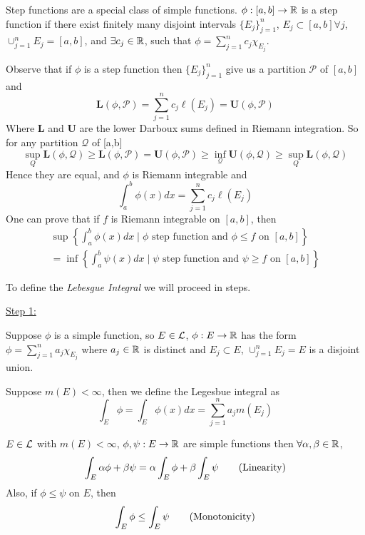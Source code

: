 \begin{definition}
    Step functions are a special class of simple functions. $\phi: [a,b] \rightarrow \mathbb{R}$ is a step function if there exist finitely many disjoint intervals $\{ E_j\}_{j=1}^{n}$, $E_j \subset [a,b] \forall j$, $\cup_{j=1}^{n} E_j = [a,b]$, and $\exists c_j \in \mathbb{R}$, such that $\phi = \sum_{j=1}^{n} c_j \chi_{E_j}$.
\end{definition}

Observe that if $\phi$ is a step function then $\{E_j\}_{j=1}^{n}$ give us a partition $\mathcal{P}$ of $[a,b]$ and
\[
    \mathbf{L} (\phi, \mathcal{P}) = \sum_{j=1}^{n} c_j \ell (E_j) = \mathbf{U}(\phi, \mathcal{P})
\]
Where $\mathbf{L}$ and $\mathbf{U}$ are the lower Darboux sums defined in Riemann integration.
So for any partition $\mathcal{Q}$ of [a,b]
\[
    \sup_{Q} \mathbf{L} (\phi, \mathcal{Q}) \geq \mathbf{L} (\phi, \mathcal{P}) =  \mathbf{U}(\phi, \mathcal{P}) \geq \inf_{\mathcal{Q}}\mathbf{U}(\phi, \mathcal{Q}) \geq \sup_{Q} \mathbf{L} (\phi, \mathcal{Q})
\]
Hence they are equal, and $\phi$ is Riemann integrable and
\[
    \int_{a}^{b} \phi(x) dx =  \sum_{j=1}^{n} c_j \ell (E_j)
\]
One can prove that if $f$ is Riemann integrable on $[a,b]$, then
\begin{gather*}
    \sup \left\{ \int_{a}^{b} \phi (x) dx \mid \phi \text{ step function and } \phi \leq f \text{ on } [a,b] \right\} \\
    = \inf \left\{ \int_{a}^{b} \psi (x) dx \mid \psi \text{ step function and } \psi \geq f \text{ on } [a,b] \right\}
\end{gather*}

To define the \emph{Lebesgue Integral} we will proceed in steps.

\underline{Step 1:}

Suppose $\phi$ is a simple function, so $E \in \mathcal{L}$, $\phi: E\rightarrow \mathbb{R}$ has the form $\phi = \sum_{j=1}^{n} a_j \chi_{E_j}$ where $a_j \in \mathbb{R}$ is distinct and $E_j \subset E$, $\cup_{j=1}^{n} E_j = E$ is a disjoint union.

Suppose $m(E) < \infty$, then we define the Legesbue integral as
\[
    \boxed{\int_{E} \phi = \int_E \phi (x) dx = \sum_{j=1}^{n} a_j m(E_j)}
\]

\begin{prop}
    $E \in \mathcal{L}$ with $m(E) < \infty$, $\phi, \psi: E \rightarrow \mathbb{R}$ are simple functions then $\forall \alpha, \beta \in \mathbb{R}$,
    \[
        \int_{E} \alpha \phi + \beta \psi = \alpha \int_{E} \phi + \beta \int_{E} \psi \tag{Linearity}
    \]
    Also, if $\phi \leq \psi$ on $E$, then
    \[
        \int_{E} \phi \leq \int_{E} \psi \tag{Monotonicity}
    \]
\end{prop}

